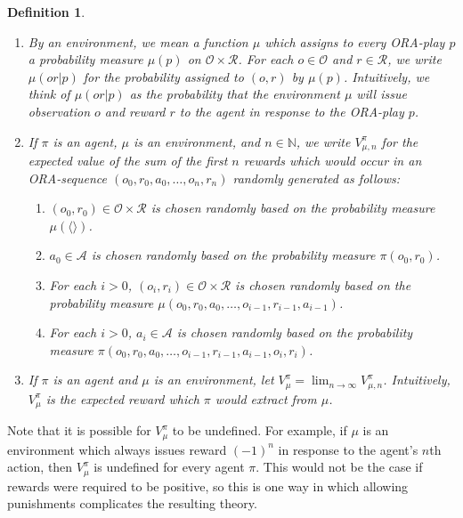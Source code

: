 \documentclass{article}
\newtheorem{definition}[theorem]{Definition}
\begin{document}
\begin{definition}
\begin{enumerate}
        will take action $a$ in response to the ORA-prompt $p$.
        \item
        By an \emph{environment}, we mean a function $\mu$
        which assigns to every ORA-play $p$ a probability measure $\mu(p)$
        on $\mathcal O\times\mathcal R$.
        For each $o\in\mathcal O$ and $r\in\mathcal R$, we write $\mu(or|p)$
        for the probability assigned to $(o,r)$ by $\mu(p)$.
        Intuitively, we think of $\mu(or|p)$ as the probability that the environment
        $\mu$ will issue observation $o$ and reward $r$ to the agent in response
        to the ORA-play $p$.
        \item
        If $\pi$ is an agent, $\mu$ is an environment, and $n\in\mathbb N$,
        we write $V^\pi_{\mu,n}$ for the expected value of the sum of
        the first $n$ rewards which would occur in an ORA-sequence
        $(o_0,r_0,a_0,\ldots,o_n,r_n)$ randomly generated as follows:
        \begin{enumerate}
            \item $(o_0,r_0)\in \mathcal O\times\mathcal R$ is chosen randomly based
            on the probability measure $\mu(\langle\rangle)$.
            \item $a_0\in\mathcal A$ is chosen randomly based on the probability
            measure $\pi(o_0,r_0)$.
            \item
            For each $i>0$,
            $(o_i,r_i)\in\mathcal O\times\mathcal R$ is chosen randomly based on
            the probability measure $\mu(o_0,r_0,a_0,\ldots,o_{i-1},r_{i-1},a_{i-1})$.
            \item
            For each $i>0$,
            $a_i\in\mathcal A$ is chosen randomly based on the probability measure
            $\pi(o_0,r_0,a_0,\ldots,o_{i-1},r_{i-1},a_{i-1},o_i,r_i)$.
        \end{enumerate}
        \item
        If $\pi$ is an agent and $\mu$ is an environment,
        let $V^\pi_\mu=\lim_{n\to\infty}V^{\pi}_{\mu,n}$.
        Intuitively, $V^\pi_\mu$ is the expected reward which $\pi$ would extract
        from $\mu$.
    \end{enumerate}
\end{definition}

Note that it is possible for $V^\pi_\mu$ to be undefined.
For example, if $\mu$ is an environment which always issues
reward $(-1)^n$ in response to the agent's $n$th action,
then $V^\pi_\mu$ is undefined for every agent $\pi$.
This would not be the case if rewards were required to be positive,
so this is one way in which allowing
punishments complicates the resulting theory.
\end{document}
